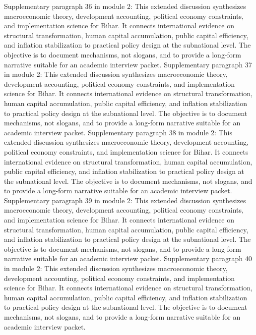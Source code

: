 \documentclass[preprint,12pt]{elsarticle}
\begin{document}
Supplementary paragraph 36 in module 2: This extended discussion synthesizes macroeconomic theory, development accounting, political economy constraints, and implementation science for Bihar. It connects international evidence on structural transformation, human capital accumulation, public capital efficiency, and inflation stabilization to practical policy design at the subnational level. The objective is to document mechanisms, not slogans, and to provide a long-form narrative suitable for an academic interview packet.
Supplementary paragraph 37 in module 2: This extended discussion synthesizes macroeconomic theory, development accounting, political economy constraints, and implementation science for Bihar. It connects international evidence on structural transformation, human capital accumulation, public capital efficiency, and inflation stabilization to practical policy design at the subnational level. The objective is to document mechanisms, not slogans, and to provide a long-form narrative suitable for an academic interview packet.
Supplementary paragraph 38 in module 2: This extended discussion synthesizes macroeconomic theory, development accounting, political economy constraints, and implementation science for Bihar. It connects international evidence on structural transformation, human capital accumulation, public capital efficiency, and inflation stabilization to practical policy design at the subnational level. The objective is to document mechanisms, not slogans, and to provide a long-form narrative suitable for an academic interview packet.
Supplementary paragraph 39 in module 2: This extended discussion synthesizes macroeconomic theory, development accounting, political economy constraints, and implementation science for Bihar. It connects international evidence on structural transformation, human capital accumulation, public capital efficiency, and inflation stabilization to practical policy design at the subnational level. The objective is to document mechanisms, not slogans, and to provide a long-form narrative suitable for an academic interview packet.
Supplementary paragraph 40 in module 2: This extended discussion synthesizes macroeconomic theory, development accounting, political economy constraints, and implementation science for Bihar. It connects international evidence on structural transformation, human capital accumulation, public capital efficiency, and inflation stabilization to practical policy design at the subnational level. The objective is to document mechanisms, not slogans, and to provide a long-form narrative suitable for an academic interview packet.
\end{document}
